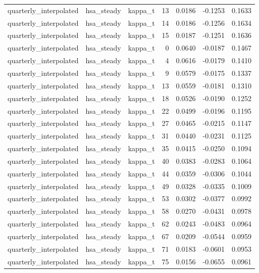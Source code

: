 \begin{tabular}{lllrrrr}
quarterly\_interpolated & hsa\_steady & kappa\_t & 13 & 0.0186 & -0.1253 & 0.1633 \\
quarterly\_interpolated & hsa\_steady & kappa\_t & 14 & 0.0186 & -0.1256 & 0.1634 \\
quarterly\_interpolated & hsa\_steady & kappa\_t & 15 & 0.0187 & -0.1251 & 0.1636 \\
quarterly\_interpolated & hsa\_steady & kappa\_t & 0 & 0.0640 & -0.0187 & 0.1467 \\
quarterly\_interpolated & hsa\_steady & kappa\_t & 4 & 0.0616 & -0.0179 & 0.1410 \\
quarterly\_interpolated & hsa\_steady & kappa\_t & 9 & 0.0579 & -0.0175 & 0.1337 \\
quarterly\_interpolated & hsa\_steady & kappa\_t & 13 & 0.0559 & -0.0181 & 0.1310 \\
quarterly\_interpolated & hsa\_steady & kappa\_t & 18 & 0.0526 & -0.0190 & 0.1252 \\
quarterly\_interpolated & hsa\_steady & kappa\_t & 22 & 0.0499 & -0.0196 & 0.1195 \\
quarterly\_interpolated & hsa\_steady & kappa\_t & 27 & 0.0465 & -0.0215 & 0.1147 \\
quarterly\_interpolated & hsa\_steady & kappa\_t & 31 & 0.0440 & -0.0231 & 0.1125 \\
quarterly\_interpolated & hsa\_steady & kappa\_t & 35 & 0.0415 & -0.0250 & 0.1094 \\
quarterly\_interpolated & hsa\_steady & kappa\_t & 40 & 0.0383 & -0.0283 & 0.1064 \\
quarterly\_interpolated & hsa\_steady & kappa\_t & 44 & 0.0359 & -0.0306 & 0.1044 \\
quarterly\_interpolated & hsa\_steady & kappa\_t & 49 & 0.0328 & -0.0335 & 0.1009 \\
quarterly\_interpolated & hsa\_steady & kappa\_t & 53 & 0.0302 & -0.0377 & 0.0992 \\
quarterly\_interpolated & hsa\_steady & kappa\_t & 58 & 0.0270 & -0.0431 & 0.0978 \\
quarterly\_interpolated & hsa\_steady & kappa\_t & 62 & 0.0243 & -0.0483 & 0.0964 \\
quarterly\_interpolated & hsa\_steady & kappa\_t & 67 & 0.0209 & -0.0544 & 0.0959 \\
quarterly\_interpolated & hsa\_steady & kappa\_t & 71 & 0.0183 & -0.0601 & 0.0953 \\
quarterly\_interpolated & hsa\_steady & kappa\_t & 75 & 0.0156 & -0.0655 & 0.0961 \\

\end{tabular}
